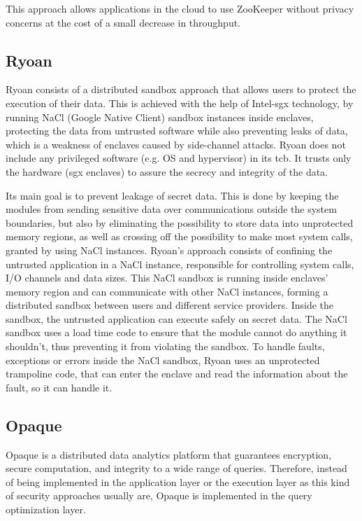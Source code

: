 This approach allows applications in the cloud to use ZooKeeper without privacy concerns at the cost of a small decrease in throughput.

\subsection{Ryoan}
\label{ssec:ryoan_sandboxing}

Ryoan \cite{ryoanPaper} consists of a distributed sandbox approach that allows users to protect the execution of their data. This is achieved with the help of Intel-\gls{sgx} \cite{intelSGX} \cite{sgxPaper} technology, by running NaCl (Google Native Client) sandbox instances inside enclaves, protecting the data from untrusted software while also preventing leaks of data, which is a weakness of enclaves caused by side-channel attacks.
Ryoan does not include any privileged software (e.g. OS and hypervisor) in its \gls{tcb}. It trusts only the hardware (\gls{sgx} enclaves) to assure the secrecy and integrity of the data.

Its main goal is to prevent leakage of secret data. This is done by keeping the modules from sending sensitive data over communications outside the system boundaries, but also by eliminating the possibility to store data into unprotected memory regions, as well as crossing off the possibility to make most system calls, granted by using NaCl instances. 
Ryoan's approach consists of confining the untrusted application in a NaCl instance, responsible for controlling system calls, I/O channels and data sizes. This NaCl sandbox is running inside enclaves' memory region and can communicate with other NaCl instances, forming a distributed sandbox between users and different service providers. Inside the sandbox, the untrusted application can execute safely on secret data. The NaCl sandbox uses a load time code to ensure that the module cannot do anything it shouldn't, thus preventing it from violating the sandbox. To handle faults, exceptions or errors inside the NaCl sandbox, Ryoan uses an unprotected trampoline code, that can enter the enclave and read the information about the fault, so it can handle it.
\subsection{Opaque}
\label{ssec:opaque}

Opaque \cite{opaquePaper} is a distributed data analytics platform that guarantees encryption, secure computation, and integrity to a wide range of queries. Therefore, instead of being implemented in the application layer or the execution layer as this kind of security approaches usually are, Opaque is implemented in the query optimization layer. 

